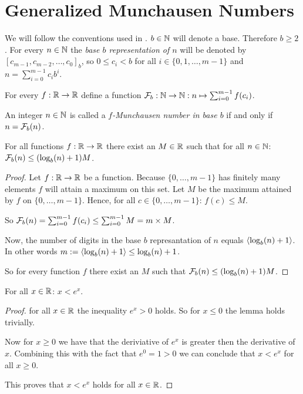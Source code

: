 \section*{Generalized Munchausen Numbers}

We will follow the conventions used in \cite{dvb}. $b\in\mathbb{N}$ will denote a base.
Therefore $b \ge 2$. For every $n \in \mathbb{N}$ the \emph{base $b$ representation
of $n$} will be denoted by $[c_{m-1}, c_{m-2}, \ldots, c_{0}]_{b}$, so 
$0 \le c_{i} < b$ for all $i \in \{0,1,\ldots,m-1\}$ and 
$n = \sum_{i=0}^{m-1} c_{i}b^{i}$.

For every $f : \mathbb{R} \rightarrow \mathbb{R}$ define a function $\mathcal{F}_{b} : \mathbb{N} \rightarrow
\mathbb{N} : n \mapsto \sum_{i=0}^{m-1} f(c_{i})$.

\begin{definition}
	An integer $n \in \mathbb{N}$ is called a \emph{$f$-Munchausen number in base $b$}
	if and only if $n = \mathcal{F}_{b}(n)$.
\end{definition}


\begin{proposition}
	For all functions $f : \mathbb{R} \rightarrow \mathbb{R}$ there exist an 
	$M \in \mathbb{R}$ such that for all $n \in \mathbb{N}$: $\mathcal{F}_{b}(n) \le (\log_{b}(n) + 1) M$.
\end{proposition}

\begin{proof}
	Let $f : \mathbb{R} \rightarrow \mathbb{R}$ be a function. Because $\{0,\ldots,m-1\}$ has 
	finitely many elements $f$ will attain a maximum on this set. Let $M$ be the
	maximum	attained by $f$ on $\{0,\ldots,m-1\}$. Hence, for all 
	$c \in \{0,\ldots,m-1\}$: $f(c) \le M$.
	
	So $\mathcal{F}_{b}(n) = \sum_{i=0}^{m-1} f(c_{i}) \le 
	\sum_{i=0}^{m-1} M = m \times M$.
	
	Now, the number of digits in the base $b$ represantation of $n$ equals 
	$\langle\log_{b}(n) + 1\rangle$. In other words $m := \langle\log_{b}(n) + 1\rangle 
	\le \log_{b}(n) + 1$.
	
	So for every function $f$ there exist an $M$ such that 
	$\mathcal{F}_{b}(n) \le (\log_{b}(n) + 1) M$.
\end{proof}

\begin{lemma}
	For all $x \in \mathbb{R}$: $x < e^{x}$.
\end{lemma}

\begin{proof}
	for all $x \in \mathbb{R}$ the inequality $e^{x} \gt 0$ holds. So for $x \le 0$ the
	lemma holds trivially.
	
	Now for $x \ge 0$ we have that the deriviative of $e^{x}$ is greater then
	the derivative of $x$. Combining this with the fact that $e^{0} = 1 > 0$ we
	can conclude that $x \lt e^{x}$ for all $x \ge 0$.
	
	This proves that $x < e^{x}$ holds for all $x \in \mathbb{R}$.
\end{proof}


